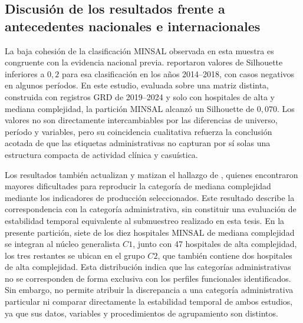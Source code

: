 \subsection{Discusión de los resultados frente a antecedentes nacionales e internacionales}
\label{sec:discusion-literatura}

La baja cohesión de la clasificación MINSAL observada en esta muestra es
congruente con la evidencia nacional previa. \citet{Giglio2021} reportaron
valores de Silhouette inferiores a $0{,}2$ para esa clasificación en los años
2014--2018, con casos negativos en algunos períodos. En este estudio, evaluada
sobre una matriz distinta, construida con registros GRD de 2019--2024 y solo con
hospitales de alta y mediana complejidad, la partición MINSAL alcanzó un
Silhouette de $0{,}070$. Los valores no son directamente intercambiables por las
diferencias de universo, período y variables, pero su coincidencia cualitativa
refuerza la conclusión acotada de que las etiquetas administrativas no capturan
por sí solas una estructura compacta de actividad clínica y casuística.

Los resultados también actualizan y matizan el hallazgo de \citet{Carlier2020},
quienes encontraron mayores dificultades para reproducir la categoría de
mediana complejidad mediante los indicadores de producción seleccionados. Este
resultado describe la correspondencia con la categoría administrativa, sin
constituir una evaluación de estabilidad temporal equivalente al submuestreo
realizado en esta tesis. En la presente partición, siete de los diez
hospitales MINSAL de mediana complejidad se integran al núcleo generalista $C1$,
junto con 47 hospitales de alta complejidad, los tres restantes se ubican en el
grupo $C2$, que también contiene dos hospitales de alta complejidad. Esta
distribución indica que las categorías administrativas no se corresponden de
forma exclusiva con los perfiles funcionales identificados. Sin embargo, no
permite atribuir la discrepancia a una categoría administrativa particular ni
comparar directamente la estabilidad temporal de ambos estudios, ya que sus
datos, variables y procedimientos de agrupamiento son distintos.

